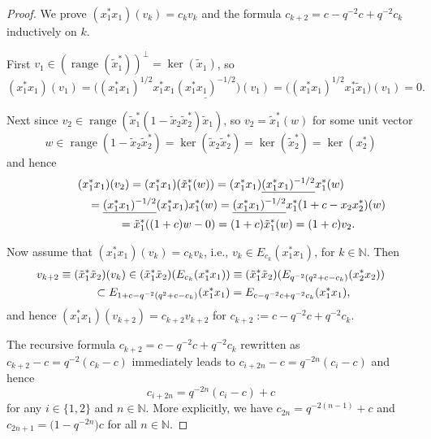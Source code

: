 \documentclass[11pt]{article}
\numberwithin{equation}{section}
\begin{document}
\begin{proof} We prove $( x_{1}^{\ast}x_{1}) ( v_{k})=c_{k}v_{k}$ and the formula $c_{k+2}=c-q^{-2}c+q^{-2}c_{k}$ inductively on
$k$.

First $v_{1}\in( \operatorname{range}( \tilde{x}_{1}^{\ast
}) ) ^{\perp}=\ker( \tilde{x}_{1}) $, so
\[
( x_{1}^{\ast}x_{1}) ( v_{1}) =\big( (
x_{1}^{\ast}x_{1}) ^{1/2}x_{1}^{\ast}x_{1}\underline{(
x_{1}^{\ast}x_{1}) ^{-1/2}}\big) ( v_{1}) =\big(
( x_{1}^{\ast}x_{1}) ^{1/2}x_{1}^{\ast}\tilde{x}_{1}\big)( v_{1}) =0.
\]

Next since $v_{2}\in\operatorname{range}( \tilde{x}_{1}^{\ast}(1-\tilde{x}_{2}\tilde{x}_{2}^{\ast}) \tilde{x}_{1}) $, so
$v_{2}=\tilde{x}_{1}^{\ast}(w) $ for some unit vector
\[
w\in\operatorname{range}( 1-\tilde{x}_{2}\tilde{x}_{2}^{\ast})
=\ker( \tilde{x}_{2}\tilde{x}_{2}^{\ast}) =\ker( \tilde
{x}_{2}^{\ast}) =\ker( x_{2}^{\ast})
\]
and hence
\begin{gather*}
( x_{1}^{\ast}x_{1}) ( v_{2}) =( x_{1}^{\ast
}x_{1}) ( \tilde{x}_{1}^{\ast}(w) ) =(
x_{1}^{\ast}x_{1}) \underline{( x_{1}^{\ast}x_{1})
^{-1/2}}x_{1}^{\ast}(w)
\\
\hphantom{( x_{1}^{\ast}x_{1}) ( v_{2})}{}
=\underline{( x_{1}^{\ast}x_{1}) ^{-1/2}}( x_{1}^{\ast
}x_{1}) x_{1}^{\ast}(w) =\underline{( x_{1}^{\ast
}x_{1}) ^{-1/2}}x_{1}^{\ast}( 1+c-x_{2}x_{2}^{\ast})
(w)\\
\hphantom{( x_{1}^{\ast}x_{1}) ( v_{2})}{}
=\tilde{x}_{1}^{\ast}( ( 1+c) w-0) =(
1+c) \tilde{x}_{1}^{\ast}(w) =( 1+c) v_{2}.
\end{gather*}

Now assume that $( x_{1}^{\ast}x_{1}) ( v_{k})
=c_{k}v_{k}$, i.e., $v_{k}\in E_{c_{k}}( x_{1}^{\ast}x_{1}) $, for
$k\in\mathbb{N}$. Then
\begin{gather*}
v_{k+2}\equiv( \tilde{x}_{1}^{\ast}\tilde{x}_{2}) (
v_{k}) \in( \tilde{x}_{1}^{\ast}\tilde{x}_{2}) (
E_{c_{k}}( x_{1}^{\ast}x_{1}) ) \equiv( \tilde
{x}_{1}^{\ast}\tilde{x}_{2}) ( E_{q^{-2}( q^{2}+c-c_{k}) }( x_{2}^{\ast}x_{2}) )
\\
\hphantom{v_{k+2}}{}
\subset E_{1+c-q^{-2}( q^{2}+c-c_{k}) }( x_{1}^{\ast}%
x_{1}) =E_{c-q^{-2}c+q^{-2}c_{k}}( x_{1}^{\ast}x_{1}) ,
\end{gather*}
and hence $( x_{1}^{\ast}x_{1}) ( v_{k+2})
=c_{k+2}v_{k+2}$ for $c_{k+2}:=c-q^{-2}c+q^{-2}c_{k}$.

The recursive formula $c_{k+2}=c-q^{-2}c+q^{-2}c_{k}$ rewritten as
$c_{k+2}-c=q^{-2}( c_{k}-c) $ immediately leads to $c_{i+2n}
-c=q^{-2n}( c_{i}-c) $ and hence
\[
c_{i+2n}=q^{-2n}( c_{i}-c) +c
\]
for any $i\in\{ 1,2\} $ and $n\in\mathbb{N}$. More explicitly, we
have $c_{2n}=q^{-2( n-1) }+c$ and $c_{2n+1}=\big(1-q^{-2n}\big) c$ for all $n\in\mathbb{N}$.
\end{proof}
\end{document}
